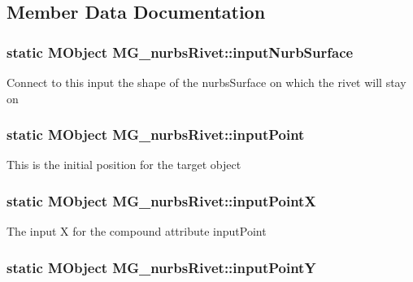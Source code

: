 \subsection{Member Data Documentation}
\hypertarget{class_m_g__nurbs_rivet_a560023fd0f07e418f27f5a2fff70981c}{
\subsubsection[{input\-Nurb\-Surface}]{\setlength{\rightskip}{0pt plus 5cm}static M\-Object M\-G\-\_\-nurbs\-Rivet\-::input\-Nurb\-Surface\hspace{0.3cm}{\ttfamily [static]}}}\label{class_m_g__nurbs_rivet_a560023fd0f07e418f27f5a2fff70981c}
Connect to this input the shape of the nurbs\-Surface on which the rivet will stay on \hypertarget{class_m_g__nurbs_rivet_a29e50ce621268c3947f456f3e43bfa25}{
\subsubsection[{input\-Point}]{\setlength{\rightskip}{0pt plus 5cm}static M\-Object M\-G\-\_\-nurbs\-Rivet\-::input\-Point\hspace{0.3cm}{\ttfamily [static]}}}\label{class_m_g__nurbs_rivet_a29e50ce621268c3947f456f3e43bfa25}
This is the initial position for the target object \hypertarget{class_m_g__nurbs_rivet_a5c09cb3fe1b1eb73e8f75176b8e7b723}{
\subsubsection[{input\-Point\-X}]{\setlength{\rightskip}{0pt plus 5cm}static M\-Object M\-G\-\_\-nurbs\-Rivet\-::input\-Point\-X\hspace{0.3cm}{\ttfamily [static]}}}\label{class_m_g__nurbs_rivet_a5c09cb3fe1b1eb73e8f75176b8e7b723}
The input X for the compound attribute input\-Point \hypertarget{class_m_g__nurbs_rivet_a9d55b7bdff71504f9531f8924cfc7d10}{
\subsubsection[{input\-Point\-Y}]{\setlength{\rightskip}{0pt plus 5cm}static M\-Object M\-G\-\_\-nurbs\-Rivet\-::input\-Point\-Y\hspace{0.3cm}{\ttfamily [static]}}}\label{class_m_g__nurbs_rivet_a9d55b7bdff71504f9531f8924cfc7d10}
